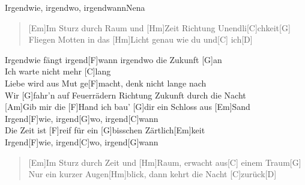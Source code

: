\begin{song}{Irgendwie, irgendwo, irgendwann}{Nena}

    \begin{verse}  
        [Em]Im Sturz durch Raum und [Hm]Zeit Richtung Unendli[C]chkeit[G] \\
        [Em]Fliegen Motten in das [Hm]Licht genau wie du und[C] ich[D] 
    \end{verse}  

    \begin{chorus}
        [Am]Irgendwie fängt irgend[F]wann irgendwo die Zukunft [G]an \\
        Ich warte nicht mehr [C]lang \\
        [Am]Liebe wird aus Mut ge[F]macht, denk nicht lange nach \\
        Wir [G]fahr'n auf Feuerrädern Richtung Zukunft durch die Nacht \\

        [Am]Gib mir die [F]Hand ich bau' [G]dir ein Schloss aus [Em]Sand \\
        Irgend[F]wie, irgend[G]wo, irgend[C]wann \\
        [Am]Die Zeit ist [F]reif für ein [G]bisschen Zärtlich[Em]keit \\
        Irgend[F]wie, irgend[C]wo, irgend[G]wann
    \end{chorus}

    \begin{verse}  
        [Em]Im Sturz durch Zeit und [Hm]Raum, erwacht aus[C] einem Traum[G]\\
        [Em]Nur ein kurzer Augen[Hm]blick, dann kehrt die Nacht [C]zurück[D]\\
    \end{verse}  


\end{song}
